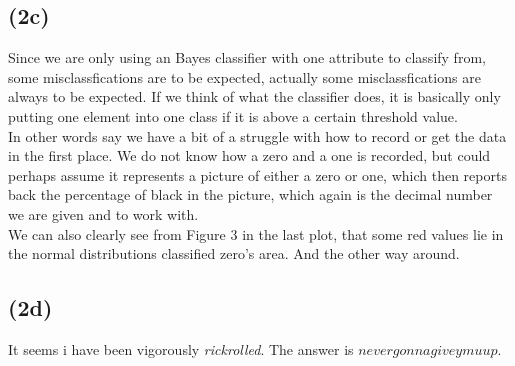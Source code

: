 \documentclass[12pt, letterpaper]{article}
\begin{document}
    \subsection*{(2c)}
      Since we are only using an Bayes classifier with one attribute to classify from, some misclassfications are to be expected, actually some misclassfications are always to be expected. If we think of what the classifier does, it is basically only putting one element into one class if it is above a certain threshold value.\\
      In other words say we have a bit of a struggle with how to record or get the data in the first place. We do not know how a zero and a one is recorded, but could perhaps assume it represents a picture of either a zero or one, which then reports back the percentage of black in the picture, which again is the decimal number we are given and to work with.\\
      We can also clearly see from Figure 3 in the last plot, that some red values lie in the normal distributions classified zero's area. And the other way around.
    \subsection*{(2d)}
      It seems i have been vigorously \textit{rickrolled}. The answer is \underline{\underline{$nevergonnagiveymuup$}}.
\end{document}
